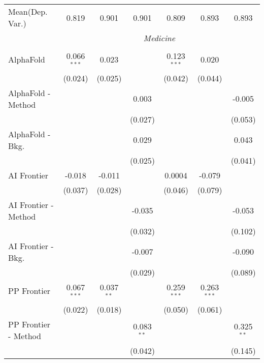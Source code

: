 \begin{tabular}{lcccccc}
Mean(Dep. Var.) & 0.819 & 0.901 & 0.901 & 0.809 & 0.893 & 0.893 \\
 & \multicolumn{6}{c}{\textit{Medicine}} \\ \\
   AlphaFold            & 0.066$^{***}$ & 0.023        &              & 0.123$^{***}$ & 0.020         &   \\   
                        & (0.024)       & (0.025)      &              & (0.042)       & (0.044)       &   \\   
   AlphaFold - Method   &               &              & 0.003        &               &               & -0.005\\   
                        &               &              & (0.027)      &               &               & (0.053)\\   
   AlphaFold - Bkg.     &               &              & 0.029        &               &               & 0.043\\   
                        &               &              & (0.025)      &               &               & (0.041)\\   
   AI Frontier          & -0.018        & -0.011       &              & 0.0004        & -0.079        &   \\   
                        & (0.037)       & (0.028)      &              & (0.046)       & (0.079)       &   \\   
   AI Frontier - Method &               &              & -0.035       &               &               & -0.053\\   
                        &               &              & (0.032)      &               &               & (0.102)\\   
   AI Frontier - Bkg.   &               &              & -0.007       &               &               & -0.090\\   
                        &               &              & (0.029)      &               &               & (0.089)\\   
   PP Frontier          & 0.067$^{***}$ & 0.037$^{**}$ &              & 0.259$^{***}$ & 0.263$^{***}$ &   \\   
                        & (0.022)       & (0.018)      &              & (0.050)       & (0.061)       &   \\   
   PP Frontier - Method &               &              & 0.083$^{**}$ &               &               & 0.325$^{**}$\\   
                        &               &              & (0.042)      &               &               & (0.145)\\   

\end{tabular}
